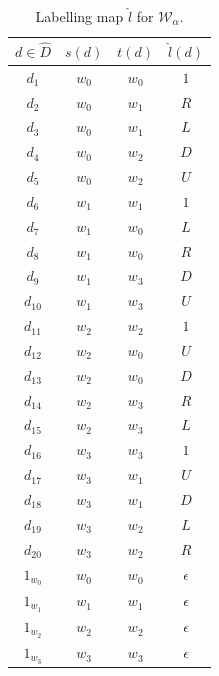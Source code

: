 \begin{table}[H]
	\centering
	\begin{tabular}{|c|cc||c|}
		\hline
		$d \in \hat{D}$ & $s(d)$  & $t(d)$  & $\hat{l}(d)$ \\
		\hline
		$d_{1}$         & $w_{0}$ & $w_{0}$ & $1$          \\
		$d_{2}$         & $w_{0}$ & $w_{1}$ & $R$          \\
		$d_{3}$         & $w_{0}$ & $w_{1}$ & $L$          \\
		$d_{4}$         & $w_{0}$ & $w_{2}$ & $D$          \\
		$d_{5}$         & $w_{0}$ & $w_{2}$ & $U$          \\
		$d_{6}$         & $w_{1}$ & $w_{1}$ & $1$          \\
		$d_{7}$         & $w_{1}$ & $w_{0}$ & $L$          \\
		$d_{8}$         & $w_{1}$ & $w_{0}$ & $R$          \\
		$d_{9}$         & $w_{1}$ & $w_{3}$ & $D$          \\
		$d_{10}$        & $w_{1}$ & $w_{3}$ & $U$          \\
		$d_{11}$        & $w_{2}$ & $w_{2}$ & $1$          \\
		$d_{12}$        & $w_{2}$ & $w_{0}$ & $U$          \\
		$d_{13}$        & $w_{2}$ & $w_{0}$ & $D$          \\
		$d_{14}$        & $w_{2}$ & $w_{3}$ & $R$          \\
		$d_{15}$        & $w_{2}$ & $w_{3}$ & $L$          \\
		$d_{16}$        & $w_{3}$ & $w_{3}$ & $1$          \\
		$d_{17}$        & $w_{3}$ & $w_{1}$ & $U$          \\
		$d_{18}$        & $w_{3}$ & $w_{1}$ & $D$          \\
		$d_{19}$        & $w_{3}$ & $w_{2}$ & $L$          \\
		$d_{20}$        & $w_{3}$ & $w_{2}$ & $R$          \\
		$1_{w_{0}}$     & $w_{0}$ & $w_{0}$ & $\epsilon$   \\
		$1_{w_{1}}$     & $w_{1}$ & $w_{1}$ & $\epsilon$   \\
		$1_{w_{2}}$     & $w_{2}$ & $w_{2}$ & $\epsilon$   \\
		$1_{w_{3}}$     & $w_{3}$ & $w_{3}$ & $\epsilon$   \\
		\hline
	\end{tabular}
	\caption{
		Labelling map $\hat{l}$ for $\mathscr{W}_{\alpha}$.
	}
	\label{tab:2x2_cyclical_labelling_with_min_actions}
\end{table}

